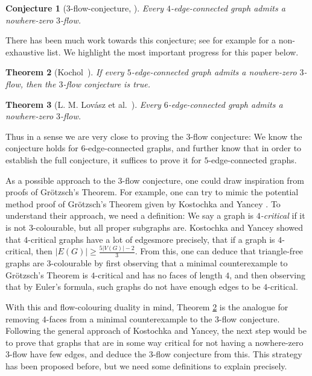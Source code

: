 \documentclass{article}
\newtheorem{theorem}{Theorem}[section]
\newtheorem{conjecture}[theorem]{Conjecture}
\begin{document}
\begin{conjecture}[$3$-flow-conjecture, \cite{tutte1954contribution}]
Every $4$-edge-connected graph admits a nowhere-zero $3$-flow.
\end{conjecture}

There has been much work towards this conjecture; see for example \cite{KOCHOL,torodial3flows,ltwz,weak3flow} for a non-exhaustive list. We highlight the most important progress for this paper below.

\begin{theorem}[Kochol~\cite{KOCHOL}]
\label{Kocholtheorem}
If every $5$-edge-connected graph admits a nowhere-zero $3$-flow, then the $3$-flow conjecture is true.
\end{theorem}

\begin{theorem}[L. M. Lovász et al.~\cite{ltwz}]
\label{6edgeconnected}
Every $6$-edge-connected graph admits a nowhere-zero $3$-flow.
\end{theorem}

Thus in a sense we are very close to proving the $3$-flow conjecture: We know
the conjecture holds for $6$-edge-connected graphs, and further know that in
order to establish the full conjecture, it suffices to prove it for
$5$-edge-connected graphs.

As a possible approach to the $3$-flow conjecture,
one could draw inspiration from proofs of Grötzsch's Theorem. For example, one
can try to mimic the potential method proof of Grötzsch's Theorem given by
Kostochka and Yancey \cite{Shortproof}. To understand their approach, we need a
definition: We say a graph is \textit{$4$-critical} if it is not
$3$-colourable, but all proper subgraphs are. Kostochka and Yancey showed that
$4$-critical graphs have a lot of edges\textemdash more precisely, that if a
graph is $4$-critical, then $|E(G)| \geq \frac{5|V(G)|-2}{3}$. From this, one
can deduce that triangle-free graphs are $3$-colourable by first observing that
a minimal counterexample to Grötzsch's Theorem is $4$-critical and has no faces
of length $4$, and then observing that by Euler's formula, such graphs do not
have enough edges to be $4$-critical.

With this and flow-colouring duality in
mind, Theorem \ref{Kocholtheorem} is the analogue for removing $4$-faces from a
minimal counterexample to the $3$-flow conjecture. Following the general
approach of Kostochka and Yancey, the next step would be to prove that graphs
that are in some way critical for not having a nowhere-zero $3$-flow have few
edges, and deduce the $3$-flow conjecture from this. This strategy has been
proposed before, but we need some definitions to  explain precisely. 
\end{document}
